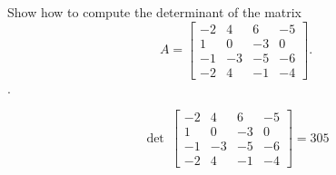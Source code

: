 
\begin{exerciseStatement}


Show how to compute the determinant of the matrix \[A= \left[\begin{array}{cccc}
-2 & 4 & 6 & -5 \\
1 & 0 & -3 & 0 \\
-1 & -3 & -5 & -6 \\
-2 & 4 & -1 & -4
\end{array}\right] .\].


\end{exerciseStatement}
    
\begin{exerciseAnswer} 
\[\operatorname{det}\  \left[\begin{array}{cccc}
-2 & 4 & 6 & -5 \\
1 & 0 & -3 & 0 \\
-1 & -3 & -5 & -6 \\
-2 & 4 & -1 & -4
\end{array}\right] = 305 \]
\end{exerciseAnswer}
    
